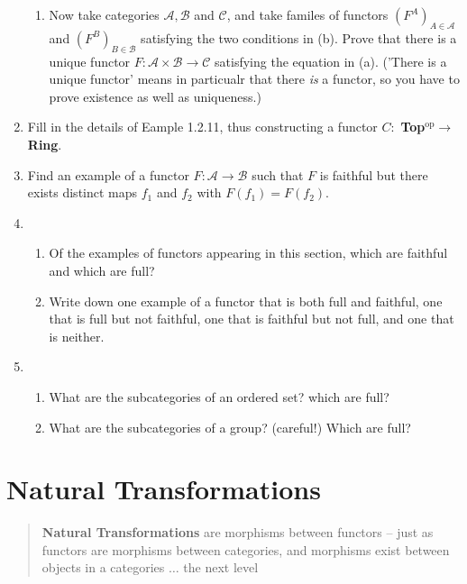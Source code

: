 \documentclass[12pt,a4paper]{report}
\newcommand{\OP}{{\operatorname{op}}}
\newcommand{\CAT}[1]{\mathscr{#1}}
\begin{document}
\begin{enumerate}[label=1.2.\arabic*]
\begin{enumerate}
	\item Now take categories $\CAT{A}, \CAT{B}$ and $\CAT{C}$, and take familes of functors $(F^A)_{A\in \CAT{A}}$ and $(F^B)_{B\in \CAT{B}}$ satisfying the two conditions in (b).  Prove that there is a unique functor $F: \CAT{A}\times\CAT{B}\to \CAT{C}$ satisfying the equation in (a).  ('There is a unique functor' means in particualr that there \textit{is} a functor, so you have to prove existence as well as uniqueness.)
\end{enumerate}

\item Fill in the details of Eample 1.2.11, thus constructing a functor $C:$ \textbf{Top}$^\OP\to $ \textbf{Ring}.

\item Find an example of a functor $F: \CAT{A}\to\CAT{B}$ such that $F$ is faithful but there exists distinct maps $f_1$ and $f_2$ with $F(f_1)=F(f_2)$.

\item \begin{enumerate}
	\item Of the examples of functors appearing in this section, which are faithful and which are full?
	
	\item Write down one example of a functor that is both full and faithful, one that is full but not faithful, one that is faithful but not full, and one that is neither.
\end{enumerate}

\item \begin{enumerate}
	\item What are the subcategories of an ordered set?  which are full?
	
	\item What are the subcategories of a group?  (careful!)  Which are full?	
\end{enumerate}

\end{enumerate}

\section{Natural Transformations}

\begin{quote}
\textbf{Natural Transformations} are morphisms between functors – just as functors are morphisms between categories, and morphisms exist between objects in a categories $\dots$ the next level
\end{quote}
\end{document}
